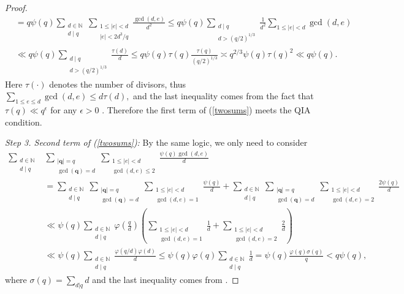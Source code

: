\documentclass[reqno]{amsart}
\theoremstyle{definition}
\theoremstyle{remark}
\begin{document}
\begin{proof}
\begin{align*}
        &= q\psi(q) \sum_{\substack{d \in \mathbb{N} \\ d \mid q}} \sum_{\substack{1 \leq |e| < d \\ |e| < 2d^3/q}} \frac{\gcd(d,e)}{d^2}
        \leq q\psi(q) \sum_{\substack{d \mid q \\ d > (q/2)^{1/3}}} \frac{1}{d^2} \sum_{1\leq |e| <d} \gcd(d,e)\\
        &\ll q\psi(q) \sum_{\substack{d \mid q \\ d > (q/2)^{1/3}}} \frac{\tau(d)}{d} \leq q\psi(q) \tau(q) \frac{\tau(q)}{(q/2)^{1/3}} \asymp q^{2/3} \psi(q) \tau(q)^2 \ll q \psi(q).
    \end{align*}
    Here $\tau(\cdot)$ denotes the number of divisors, thus $\sum_{1\leq e\leq d} \gcd(d,e) \leq d\tau(d),$ and the last inequality comes from the fact that $\tau(q) \ll q^{\epsilon}$ for any $\epsilon>0$ \cite[Thm 315]{HW08}. Therefore the first term of (\ref{twosums}) meets the QIA condition.

    \textit{Step 3. Second term of (\ref{twosums}):} By the same logic, we only need to consider
    \begin{align*}
        \sum_{\substack{d \in \mathbb{N} \\ d \mid q}} &\sum_{\substack{|\mathbf{q}|= q \\ \gcd(\mathbf{q}) = d}} \sum_{\substack{1 \leq |e| < d \\ \gcd(d,e) \leq 2}} \frac{\psi(q)\gcd(d,e)}{d} \\
        &= \sum_{\substack{d \in \mathbb{N} \\ d \mid q}} \sum_{\substack{|\mathbf{q}|= q \\ \gcd(\mathbf{q}) = d}} \sum_{\substack{1 \leq |e| < d \\ \gcd(d,e) =1}} \frac{\psi(q)}{d} + \sum_{\substack{d \in \mathbb{N} \\ d \mid q}} \sum_{\substack{|\mathbf{q}|= q \\ \gcd(\mathbf{q}) = d}} \sum_{\substack{1 \leq |e| < d \\ \gcd(d,e) =2}} \frac{2\psi(q)}{d} \\
        &\ll \psi(q) \sum_{\substack{d \in \mathbb{N} \\ d \mid q}} \varphi \left(\frac{q}{d}\right) \left( \sum_{\substack{1 \leq |e| < d \\ \gcd(d,e) =1}} \frac{1}{d} + \sum_{\substack{1 \leq |e| < d \\ \gcd(d,e) =2}} \frac{2}{d} \right) \\
        &\ll \psi(q) \sum_{\substack{d \in \mathbb{N} \\ d \mid q}} \frac{\varphi(q/d) \varphi(d)}{d}  \leq \psi(q) \varphi(q) \sum_{\substack{d \in \mathbb{N} \\ d \mid q}} \frac{1}{d} = \psi(q)\frac{\varphi(q) \sigma(q)}{q} <q\psi(q),
    \end{align*}
    where $\sigma(q) = \sum_{d|q} d$ and the last inequality comes from \cite[Thm 329]{HW08}.
\end{proof}
\end{document}
